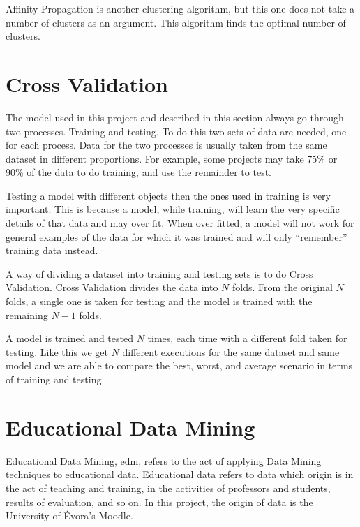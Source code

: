 Affinity Propagation is another clustering algorithm, but this one does not
take a number of clusters as an argument. This algorithm finds the optimal
number of clusters.~\cite{book_ml,book_dm_practical}

\section{Cross Validation}

The model used in this project and described in this section always go through
two processes. Training and testing. To do this two sets of data are needed,
one for each process. Data for the two processes is usually taken from the same
dataset in different proportions. For example, some projects may take 75\% or
90\% of the data to do training, and use the remainder to test.

Testing a model with different objects then the ones used in training is very
important. This is because a model, while training, will learn the very
specific details of that data and may over fit. When over fitted, a model will
not work for general examples of the data for which it was trained and will
only ``remember'' training data instead.

A way of dividing a dataset into training and testing sets is to do Cross
Validation. Cross Validation divides the data into $ N $ folds. From the
original $ N $ folds, a single one is taken for testing and the model is
trained with the remaining $ N - 1 $ folds.

A model is trained and tested $ N $ times, each time with a different fold
taken for testing. Like this we get $ N $ different executions for the same
dataset and same model and we are able to compare the best, worst, and average
scenario in terms of training and testing.~\cite{book_dm_practical}

\section{Educational Data Mining}

Educational Data Mining, \gls{edm}, refers to the act of applying Data Mining
techniques to educational data. Educational data refers to data which origin is
in the act of teaching and training, in the activities of professors and
students, results of evaluation, and so on. In this project, the origin of data
is the University of Évora's Moodle.

